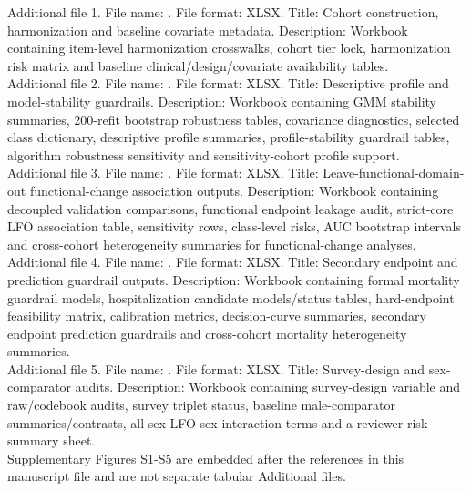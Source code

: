 \documentclass[pdflatex,sn-vancouver-num]{sn-jnl}
\begin{document}
Additional file 1. File name: . File format: XLSX. Title: Cohort construction, harmonization and baseline covariate metadata. Description: Workbook containing item-level harmonization crosswalks, cohort tier lock, harmonization risk matrix and baseline clinical/design/covariate availability tables.\\
Additional file 2. File name: . File format: XLSX. Title: Descriptive profile and model-stability guardrails. Description: Workbook containing GMM stability summaries, 200-refit bootstrap robustness tables, covariance diagnostics, selected class dictionary, descriptive profile summaries, profile-stability guardrail tables, algorithm robustness sensitivity and sensitivity-cohort profile support.\\
Additional file 3. File name: . File format: XLSX. Title: Leave-functional-domain-out functional-change association outputs. Description: Workbook containing decoupled validation comparisons, functional endpoint leakage audit, strict-core LFO association table, sensitivity rows, class-level risks, AUC bootstrap intervals and cross-cohort heterogeneity summaries for functional-change analyses.\\
Additional file 4. File name: . File format: XLSX. Title: Secondary endpoint and prediction guardrail outputs. Description: Workbook containing formal mortality guardrail models, hospitalization candidate models/status tables, hard-endpoint feasibility matrix, calibration metrics, decision-curve summaries, secondary endpoint prediction guardrails and cross-cohort mortality heterogeneity summaries.\\
Additional file 5. File name: . File format: XLSX. Title: Survey-design and sex-comparator audits. Description: Workbook containing survey-design variable and raw/codebook audits, survey triplet status, baseline male-comparator summaries/contrasts, all-sex LFO sex-interaction terms and a reviewer-risk summary sheet.\\

Supplementary Figures S1-S5 are embedded after the references in this manuscript file and are not separate tabular Additional files.


\end{document}
